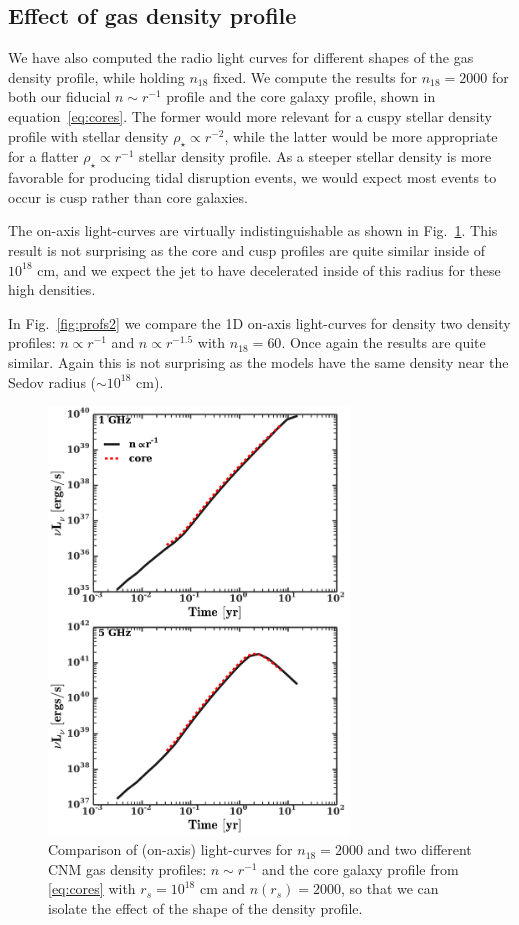 \documentclass[usenatbib,fleqn]{mnras}
\begin{document}
\subsection{Effect of gas density profile}
\label{sec:profileComp}
We have also computed the radio light curves for different shapes of
the gas density profile, while holding $n_{18}$ fixed. We compute the
results for $n_{18}=2000$ for both our fiducial $n\sim r^{-1}$ profile and
the core galaxy profile, shown in equation~\eqref{eq:cores}. The
former would more relevant for a cuspy stellar density profile with
stellar density $\rho_{\star}\propto r^{-2}$, while the latter would be more
appropriate for a flatter $\rho_{\star}\propto r^{-1}$ stellar density
profile. As a steeper stellar density is more favorable for producing
tidal disruption events, we would expect most events to occur is cusp
rather than core galaxies.

The on-axis light-curves are virtually indistinguishable as shown in
Fig.~\ref{fig:cores}. This result is not surprising as
the core and cusp profiles are quite similar inside of $10^{18}$ cm,
and we expect the jet to have decelerated inside of this radius for
these high densities. 

In Fig.~\ref{fig:profs2} we compare the 1D on-axis light-curves for
density two density profiles: $n\propto r^{-1}$ and $n\propto r^{-1.5}$
with $n_{18}=60$. Once again the results are quite similar. Again this
is not surprising as the models have the same density near the Sedov
radius ($\sim 10^{18}$ cm).  


\begin{figure} 
  \includegraphics[width=8cm]{fig_cores.pdf}
  \caption{\label{fig:cores} Comparison of (on-axis) light-curves for
    $n_{18}=2000$ and two different CNM gas density profiles: $n\sim
    r^{-1}$ and the core galaxy profile from \eqref{eq:cores} with
    $r_s=10^{18}$ cm and $n(r_s)=2000$, so that we can isolate the
    effect of the shape of the density profile.}
\end{figure}
\end{document}
